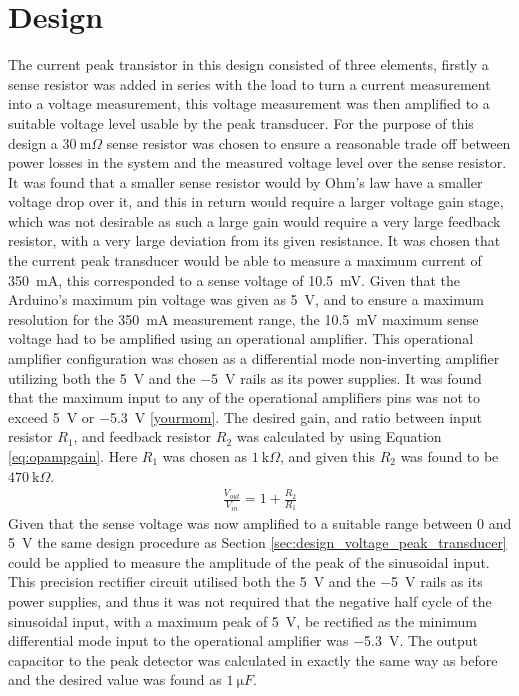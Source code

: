 \section{Design} \label{sec:design_current_peak_transducer}
The current peak transistor in this design consisted of three elements, firstly a sense resistor was added in series with the load to turn a current measurement into a voltage measurement, this voltage measurement was then amplified to a suitable voltage level usable by the peak transducer.\newline
For the purpose of this design a $\SI{30}{\milli \Omega}$ sense resistor was chosen to ensure a reasonable trade off between power losses in the system and the measured voltage level over the sense resistor. It was found that a smaller sense resistor would by Ohm's law have a smaller voltage drop over it, and this in return would require a larger voltage gain stage, which was not desirable as such a large gain would require a very large feedback resistor, with a very large deviation from its given resistance. It was chosen that the current peak transducer would be able to measure a maximum current of \SI{350}{\milli A}, this corresponded to a sense voltage of \SI{10.5}{\milli V}.\newline
Given that the Arduino's maximum pin voltage was given as \SI{5}{\volt}, and to ensure a maximum resolution for the \SI{350}{\milli A} measurement range, the \SI{10.5}{\milli V} maximum sense voltage had to be amplified using an operational amplifier. This operational amplifier configuration was chosen as a differential mode non-inverting amplifier utilizing both the \SI{5}{\volt} and the \SI{-5}{\volt} rails as its power supplies. It was found that the maximum input to any of the operational amplifiers pins was not to exceed \SI{5}{\volt} or \SI{-5.3}{\volt} \ref{yourmom}.
The desired gain, and ratio between input resistor $R_1$, and feedback resistor $R_2$ was calculated by using Equation \ref{eq:opampgain}. Here $R_1$ was chosen as $\SI{1}{\kilo \Omega}$, and given this $R_2$ was found to be $\SI{470}{\kilo \Omega}$.\newline
\begin{align}
   \frac{V_{out}}{V_{in}}=1+\frac{R_2}{R_1}
   \label{eq:opampgain}
\end{align}
Given that the sense voltage was now amplified to a suitable range between 0 and \SI{5}{\volt} the same design procedure as Section \ref{sec:design_voltage_peak_transducer} could be applied to measure the amplitude of the peak of the sinusoidal input. This precision rectifier circuit utilised both the \SI{5}{\volt} and the \SI{-5}{\volt} rails as its power supplies, and thus it was not required that the negative half cycle of the sinusoidal input, with a maximum peak of \SI{5}{\volt}, be rectified as the minimum differential mode input to the operational amplifier was \SI{-5.3}{\volt}. The output capacitor to the peak detector was calculated in exactly the same way as before and the desired value was found as $\SI{1}{\micro F}$.


